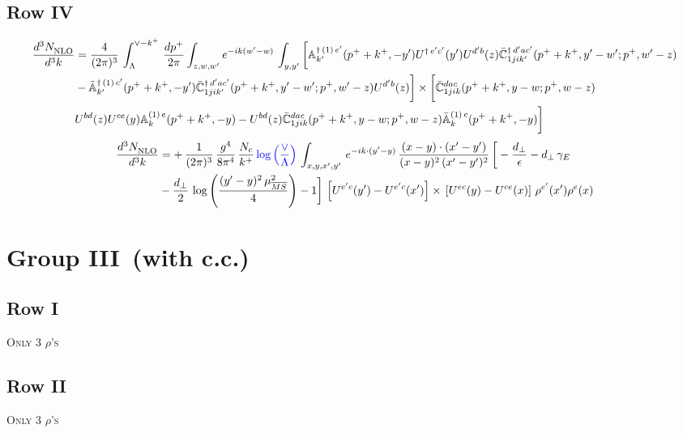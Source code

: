 \documentclass[9pt]{article}
\def\mf#1{\mathbb{#1}}
\numberwithin{equation}{section}
\begin{document}
\subsection{Row IV}
\begin{align}
    \frac{d^{3}N_{\rm NLO}^{\rm}}{d^{3}k}  & = \frac{4}{(2\pi)^{3}}\,\int_{\Lambda}^{\vee-k^{+}}\, \frac{dp^{+}}{2\pi}\int_{z,w,w^{\prime}} e^{-ik(w^{\prime}-w)}\,  \int_{y,y^{\prime}}\bigg[\mf{A}^{\dagger\, (1)\,e^{\prime}}_{k^{\prime}}(p^{+}+k^{+},-y^{\prime})U^{\dagger\, e^{\prime}c^{\prime}}(y^{\prime})U^{d^{\prime}b}(z) \Bar{\mf{C}}^{\dagger\, d^{\prime}ac^{\prime}}_{1jik^{\prime}}(p^{+}+k^{+},y^{\prime}-w^{\prime}; p^{+},w^{\prime}-z) \notag \\ &  -\Bar{\mf{A}}^{\dagger\, (1)\,c^{\prime}}_{k^{\prime}}(p^{+}+k^{+},-y^{\prime}) \Bar{\mf{C}}^{\dagger\, d^{\prime}ac^{\prime}}_{1jik^{\prime}}(p^{+}+k^{+},y^{\prime}-w^{\prime}; p^{+},w^{\prime}-z)U^{d^{\prime}b}(z)\bigg]\times\bigg[\Bar{\mf{C}}^{dac}_{1jik}(p^{+}+k^{+},y-w; p^{+},w-z)\notag \\ & U^{bd}(z)U^{ce}(y) \mf{A}^{(1)\,e}_{k}(p^{+}+k^{+},-y) -U^{bd}(z) \Bar{\mf{C}}^{dac}_{1jik}(p^{+}+k^{+},y-w; p^{+},w-z)\Bar{\mf{A}}^{(1)\,c}_{k}(p^{+}+k^{+},-y)\bigg]\nonumber
\end{align}
\begin{align}
    \frac{d^{3}N_{\rm NLO}^{\rm}}{d^{3}k}  & =  +\,\frac{1}{(2\pi)^{3}}\,\frac{g^{4}}{8\pi^{4}}\, \frac{N_{c}}{k^{+}}\,{\color{blue}\log{\left(\frac{\vee}{\Lambda}\right)}}\,\int_{x,y,x',y'}\,e^{-ik\cdot (y'-y)}\,\frac{(x-y)\cdot (x'-y')}{(x-y)^{2}\,(x'-y')^{2}}\,\bigg[-\frac{d_{\perp}}{\epsilon}-d_{\perp}\,\gamma_{E}\notag \\ & -\frac{d_{\perp}}{2}\,\log{\left(\frac{(y'-y)^{2}\,\mu^{2}_{\overline{MS}}}{4}\right)}-1\bigg]\,\left[U^{e'c}(y') - U^{e'c}(x')\right] \times\, \left[U^{ec}(y) - U^{ce}(x)\right]\, \rho^{e'}(x') \rho^{e}(x)
\end{align}
\section{Group III\, (with c.c.)}
\subsection{Row I}
\textsc{Only 3 $\rho$'s}
\subsection{Row II}
\textsc{Only 3 $\rho$'s}
\end{document}
